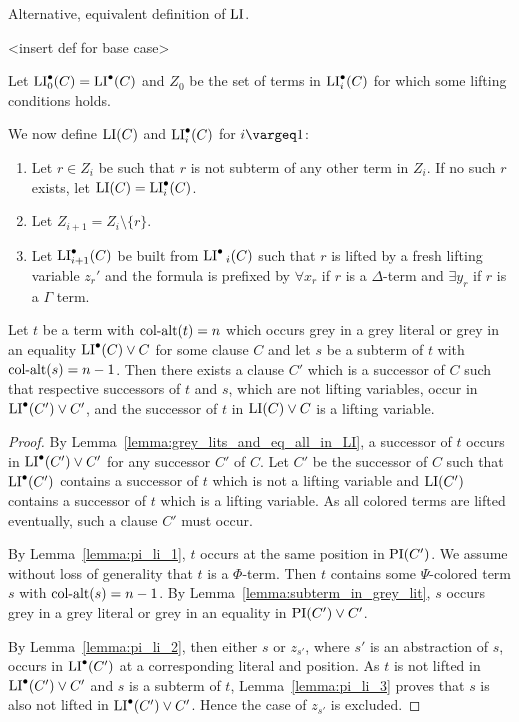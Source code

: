 \documentclass[%
	draft=false,%
	numbers=noendperiod,%
	11pt,%
	a4paper,%
	oneside,%
	openany,%
]{memoir}
\begin{document}
\begin{defi}
	Alternative, equivalent definition of $\operatorname{LI}$.

	<insert def for base case>

	Let $\operatorname{LI}^\bullet_0(C) = \operatorname{LI}^\bullet(C)$ and
	$Z_0$ be the set of terms in $\operatorname{LI}^\bullet_i(C)$ for which some lifting conditions holds.

	We now define $\operatorname{LI}(C)$ and $\operatorname{LI}^\bullet_i(C)$ for $i\vargeq 1$:
	\begin{enumerate}
		\item
			Let $r \in Z_i$ be such that $r$ is not subterm of any other term in $Z_i$.
			If no such $r$ exists, let $\operatorname{LI}(C) = \operatorname{LI}^\bullet_i(C)$.

		\item
			Let $Z_{i+1} = Z_i \setminus \{ r\}$.

		\item
			Let $\operatorname{LI}^\bullet_{i+1}(C)$ be built from $\operatorname{LI}^\bullet{_i}(C)$ such that $r$ is lifted by a fresh lifting variable $z_r'$ and the formula is prefixed by $\forall x_r $ if $r$ is a $\Delta$-term and $\exists y_r$ if $r$ is a $\Gamma$ term.
			\qedhere

	\end{enumerate}

\end{defi}

\cbstart
\begin{lemma}
	\label{lemma:subterm_of_multicol_term}
	Let $t$ be a term with $\operatorname{col-alt}(t)=n$ which occurs grey in a grey literal or grey in an equality $\operatorname{LI}^\bullet(C) \lor C$ for some clause $C$ and let $s$ be a subterm of $t$ with $\operatorname{col-alt}(s) = n-1$.
	Then there exists a clause $C'$ which is a successor of $C$ such that respective successors of $t$ and $s$, which are not lifting variables, occur in $\operatorname{LI}^\bullet(C') \lor C'$, and the successor of $t$ in $\operatorname{LI}(C) \lor C$ is a lifting variable.
\end{lemma}
\begin{proof}
	By Lemma~\ref{lemma:grey_lits_and_eq_all_in_LI}, a successor of $t$ occurs in $\operatorname{LI}^\bullet(C') \lor C'$ for any successor $C'$ of $C$.
	Let $C'$ be the successor of $C$ such that $\operatorname{LI}^\bullet(C')$ contains a successor of $t$ which is not a lifting variable and $\operatorname{LI}(C')$ contains a successor of $t$ which is a lifting variable.
	As all colored terms are lifted eventually, such a clause $C'$ must occur.

	By Lemma~\ref{lemma:pi_li_1}, $t$ occurs at the same position in $\operatorname{PI}(C')$.
	We assume without loss of generality that $t$ is a $\Phi$-term.
	Then $t$ contains some $\Psi$-colored term $s$ with $\operatorname{col-alt}(s) = n-1$.
	By Lemma~\ref{lemma:subterm_in_grey_lit}, $s$ occurs grey in a grey literal or grey in an equality in $\operatorname{PI}(C')\lor C'$.

	By Lemma~\ref{lemma:pi_li_2}, then either $s$ or $z_{s'}$, where $s'$ is an abstraction of $s$, occurs in $\operatorname{LI}^\bullet(C')$ at a corresponding literal and position. 
	As $t$ is not lifted in $\operatorname{LI}^\bullet(C') \lor C'$ and $s$ is a subterm of $t$, Lemma~\ref{lemma:pi_li_3} proves that $s$ is also not lifted in $\operatorname{LI}^\bullet(C') \lor C'$. Hence the case of $z_{s'}$ is excluded.
\end{proof}
\end{document}
